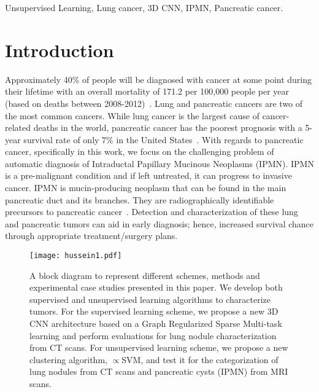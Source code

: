 \documentclass[journal]{IEEEtran}
\begin{document}
\begin{IEEEkeywords}
Unsupervised Learning, Lung cancer,  3D CNN, IPMN, Pancreatic cancer. 
\end{IEEEkeywords}

\IEEEpeerreviewmaketitle

\section{Introduction}
Approximately 40\% of people will be diagnosed with cancer at some point during their lifetime with an overall mortality of 171.2 per 100,000 people per year (based on deaths between 2008-2012)~\cite{americancancer}. Lung and pancreatic cancers are two of the most common cancers. While lung cancer is the largest cause of cancer-related deaths in the world, pancreatic cancer has the poorest prognosis with a 5-year survival rate of only 7\% in the United States~\cite{americancancer}. %
With regards to pancreatic cancer, specifically in this work, we focus on the challenging problem of automatic diagnosis of Intraductal Papillary Mucinous Neoplasms (IPMN). IPMN is a pre-malignant condition and if left untreated, it can progress to invasive cancer. IPMN is mucin-producing neoplasm that can be found in the main pancreatic duct and its branches. They are radiographically identifiable precursors to pancreatic cancer~\cite{sadot2015tumor}. %
Detection and characterization of these lung and pancreatic tumors can aid in early diagnosis; hence, increased survival chance through appropriate treatment/surgery plans. 

\begin{figure}[t]
\centering
\texttt{[image: hussein1.pdf]}
\caption{A block diagram to represent different schemes, methods and experimental case studies presented in this paper. We develop both  supervised and unsupervised learning algorithms to characterize tumors. For the supervised learning scheme, we propose a new  3D CNN architecture based on a Graph Regularized Sparse Multi-task learning and perform evaluations for lung nodule characterization from CT scans. For unsupervised learning scheme, we propose a new clustering algorithm, $\propto$SVM, and test it for the categorization of lung nodules from CT scans and pancreatic cysts (IPMN) from MRI scans.}
\label{fig:blockdiag}
\end{figure}
\end{document}
